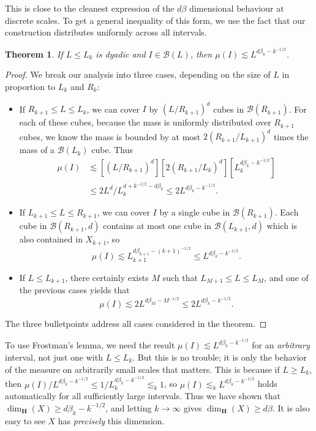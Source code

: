 \documentclass{article}
\theoremstyle{plain}
\theoremstyle{plain}
\newtheorem{theorem}{Theorem}
\begin{document}
This is close to the cleanest expression of the $d \beta$ dimensional behaviour at discrete scales. To get a general inequality of this form, we use the fact that our construction distributes uniformly across all intervals.

\begin{theorem}
	If $L \leq L_k$ is dyadic and $I \in \mathcal{B}(L)$, then $\mu(I) \lesssim L^{d\beta_k - k^{-1/2}}$.
\end{theorem}
\begin{proof}
	We break our analysis into three cases, depending on the size of $L$ in proportion to $L_k$ and $R_k$:
	\begin{itemize}
		\item If $R_{k+1} \leq L \leq L_k$, we can cover $I$ by $(L/R_{k+1})^d$ cubes in $\mathcal{B}(R_{k+1})$. For each of these cubes, because the mass is uniformly distributed over $R_{k+1}$ cubes, we know the mass is bounded by at most $2(R_{k+1}/L_{k+1})^d$ times the mass of a $\mathcal{B}(L_k)$ cube. Thus
		\begin{align*}
			\mu(I) &\lesssim [(L/R_{k+1})^d] [2(R_{k+1}/L_k)^d] [L_k^{d \beta_k - k^{-1/2}}]\\
			&\leq 2 L^d / L_k^{d + k^{-1/2} - d \beta_k} \leq 2 L^{d \beta_k - k^{-1/2}}.
		\end{align*}

		\item If $L_{k+1} \leq L \leq R_{k+1}$, we can cover $I$ by a single cube in $\mathcal{B}(R_{k+1})$. Each cube in $\mathcal{B}(R_{k+1},d)$ contains at most one cube in $\mathcal{B}(L_{k+1},d)$ which is also contained in $X_{k+1}$, so
		\[ \mu(I) \lesssim L_{k+1}^{d\beta_{k+1} - (k+1)^{-1/2}} \leq L^{d \beta_k - k^{-1/2}}. \]

		\item If $L \leq L_{k+1}$, there certainly exists $M$ such that $L_{M+1} \leq L \leq L_M$, and one of the previous cases yields that
		\[ \mu(I) \lesssim 2 L^{d \beta_M - M^{-1/2}} \leq 2 L^{d \beta_k - k^{-1/2}}. \]
	\end{itemize}
	The three bulletpoints address all cases considered in the theorem.
\end{proof}

To use Frostman's lemma, we need the result $\mu(I) \lesssim L^{d \beta_k - k^{-1/2}}$ for an {\it arbitrary} interval, not just one with $L \leq L_k$. But this is no trouble; it is only the behavior of the measure on arbitrarily small scales that matters. This is because if $L \geq L_k$, then $\mu(I)/L^{d \beta_k - k^{-1/2}} \leq 1/L_k^{d \beta_k - k^{-1/2}} \lesssim_k 1$, so $\mu(I) \lesssim_k L^{d \beta_k - k^{-1/2}}$ holds automatically for all sufficiently large intervals. Thus we have shown that $\dim_{\mathbf{H}}(X) \geq d \beta_k - k^{-1/2}$, and letting $k \to \infty$ gives $\dim_{\mathbf{H}}(X) \geq d \beta$. It is also easy to see $X$ has {\it precisely} this dimension.
\end{document}
